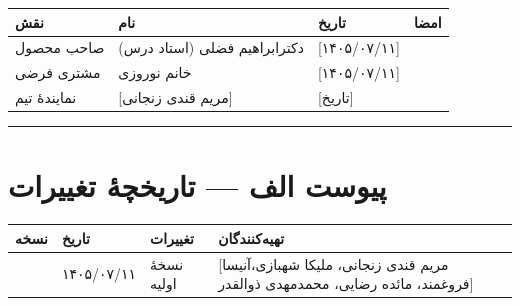\documentclass[12pt, a4paper]{article}
\begin{document}
{\def\LTcaptype{none} %
\begin{longtable}[]{@{}
  >{\raggedright\arraybackslash}p{}
  >{\raggedright\arraybackslash}p{}
  >{\raggedright\arraybackslash}p{}
  >{\raggedright\arraybackslash}p{}@{}}
\toprule\noalign{}
\begin{minipage}[b]{\linewidth}\raggedright
نقش
\end{minipage} & \begin{minipage}[b]{\linewidth}\raggedright
نام
\end{minipage} & \begin{minipage}[b]{\linewidth}\raggedright
تاریخ
\end{minipage} & \begin{minipage}[b]{\linewidth}\raggedright
امضا
\end{minipage} \\
\midrule\noalign{}
\endhead
\bottomrule\noalign{}
\endlastfoot
صاحب محصول & دکترابراهیم فضلی (استاد درس) & {[}۱۴۰۵/۰۷/۱۱{]} & \\
مشتری فرضی & خانم نوروزی & {[}۱۴۰۵/۰۷/۱۱{]} & \\
نمایندهٔ تیم & {[}مریم قندی زنجانی{]} & {[}تاریخ{]} & \\
\end{longtable}
}

\begin{center}\rule{0.5\linewidth}{0.5pt}\end{center}

\section*{پیوست الف — تاریخچهٔ تغییرات}

{\def\LTcaptype{none} %
\begin{longtable}[]{@{}
  >{\raggedright\arraybackslash}p{}
  >{\raggedright\arraybackslash}p{}
  >{\raggedright\arraybackslash}p{}
  >{\raggedright\arraybackslash}p{}@{}}
\toprule\noalign{}
\begin{minipage}[b]{\linewidth}\raggedright
نسخه
\end{minipage} & \begin{minipage}[b]{\linewidth}\raggedright
تاریخ
\end{minipage} & \begin{minipage}[b]{\linewidth}\raggedright
تغییرات
\end{minipage} & \begin{minipage}[b]{\linewidth}\raggedright
تهیه‌کنندگان
\end{minipage} \\
\midrule\noalign{}
\endhead
\bottomrule\noalign{}
\endlastfoot
1.0 & ۱۴۰۵/۰۷/۱۱ & نسخهٔ اولیه & {[}مریم قندی زنجانی، ملیکا شهبازی،آنیسا فروغمند، مائده رضایی، محمدمهدی ذوالقدر{]} \\
\end{longtable}
}
\end{document}
